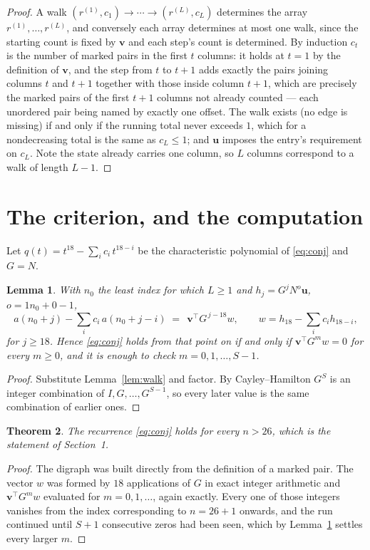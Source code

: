 \documentclass[11pt,a4paper]{article}
\theoremstyle{plain}
\newtheorem{theorem}{Theorem}
\newtheorem{lemma}[theorem]{Lemma}
\theoremstyle{definition}
\begin{document}
\begin{proof}
A walk $(r^{(1)},c_1)\to\cdots\to(r^{(L)},c_L)$ determines the array
$r^{(1)},\dots,r^{(L)}$, and conversely each array determines at most one walk, since the
starting count is fixed by $\mathbf{v}$ and each step's count is determined. By induction
$c_t$ is the number of marked pairs in the first $t$ columns: it holds at $t=1$ by the
definition of $\mathbf{v}$, and the step from $t$ to $t+1$ adds exactly the pairs joining
columns $t$ and $t+1$ together with those inside column $t+1$, which are precisely the marked
pairs of the first $t+1$ columns not already counted --- each unordered pair being named by
exactly one offset. The walk exists (no edge is missing) if and only if the running total
never exceeds $1$, which for a nondecreasing total is the same as $c_L\le1$; and
$\mathbf{u}$ imposes the entry's requirement on $c_L$. Note the state already carries one
column, so $L$ columns correspond to a walk of length $L-1$.
\end{proof}

\section{The criterion, and the computation}

Let $q(t)=t^{18}-\sum_i c_i\,t^{18-i}$ be the characteristic polynomial of
\eqref{eq:conj} and $G=N$.

\begin{lemma}\label{lem:crit}
With $n_0$ the least index for which $L\ge1$ and $h_j=G^{j}N^{o}\mathbf{u}$,
$o=1n_0+0-1$,
\[
a(n_0+j)-\sum_i c_i\,a(n_0+j-i)\;=\;\,\mathbf{v}^{\!\top}G^{\,j-18}w,
\qquad w=h_{18}-\sum_i c_i h_{18-i},
\]
for $j\ge18$. Hence \eqref{eq:conj} holds from that point on if and only if
$\mathbf{v}^{\!\top}G^{m}w=0$ for every $m\ge0$, and it is enough to check
$m=0,1,\dots,S-1$.
\end{lemma}

\begin{proof}
Substitute Lemma~\ref{lem:walk} and factor. By Cayley--Hamilton $G^{S}$ is an integer
combination of $I,G,\dots,G^{S-1}$, so every later value is the same combination of earlier
ones.
\end{proof}

\begin{theorem}
The recurrence \eqref{eq:conj} holds for every $n>26$, which is the statement of
Section~1.
\end{theorem}

\begin{proof}
The digraph was built directly from the definition of a marked pair. The vector $w$ was
formed by $18$ applications of $G$ in exact integer arithmetic and
$\mathbf{v}^{\!\top}G^{m}w$ evaluated for $m=0,1,\dots$, again exactly. Every one of
those integers vanishes from the index corresponding to $n=26+1$ onwards, and the run
continued until $S+1$ consecutive zeros had been seen, which by Lemma~\ref{lem:crit}
settles every larger $m$.
\end{proof}
\end{document}
